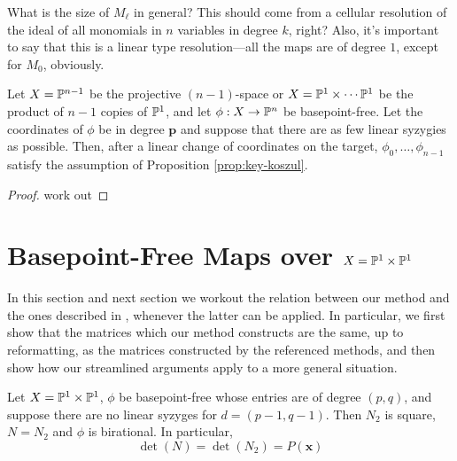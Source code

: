 \documentclass[fleqn,reqno]{amsart}
\numberwithin{first}{chapter}
\numberwithin{section}{chapter}
\numberwithin{equation}{first}
\begin{document}
\begin{question}
	What is the size of $M_\ell$ in general? This should come from a cellular resolution
	of the ideal of all monomials in $n$ variables in degree $k$, right?
	Also, it's important to say that this is a linear type resolution---all the maps are
	of degree $1$, except for $M_0$, obviously.
\end{question}

\begin{corollary}
	Let $X=\mathbb{P}^{n-1}$ be the projective $(n-1)$-space or
	$X=\mathbb{P}^1\times\cdots\mathbb{P}^1$ be the product of $n-1$ copies of $\mathbb{P}^1$,
	and let $\phi:X\to\mathbb{P}^n$ be basepoint-free.
	Let the coordinates of $\phi$ be in degree $\mathbf p$
	and suppose that there are as few linear syzygies as possible.
	Then, after a linear change of coordinates on the target,
	$\phi_0,\ldots,\phi_{n-1}$ satisfy the assumption of Proposition \ref{prop:key-koszul}.
\end{corollary}

\begin{proof}
	work out
\end{proof}

\begin{paragraf}
\end{paragraf}



\section{Basepoint-Free Maps over $X=\mathbb{P}^1\times\mathbb{P}^1$}
\label{sec:bpf-maps-ppp}

\begin{paragraph*}
	In this section and next section we workout the relation between our method and
	the ones described in \citet{00-CGZ-JSC}, whenever the latter can be applied.
	In particular, we first show that the matrices which our method constructs are the same, up to
	reformatting, as the matrices constructed by the referenced methods,
	and then show how our streamlined arguments apply to a more general situation.
\end{paragraph*}

\begin{theorem}
	\label{thm:rel-moving-quadrics}
	Let $X=\mathbb{P}^1\times\mathbb{P}^1$, $\phi$ be basepoint-free whose entries are of degree $(p,q)$,
	and suppose there are no linear syzyges for $d=(p-1,q-1)$.
	Then $N_2$ is square, $N=N_2$ and $\phi$ is birational. In particular,
	\[
		\det(N)=\det(N_2)=P(\mathbf x)
	\]
\end{theorem}
\end{document}

